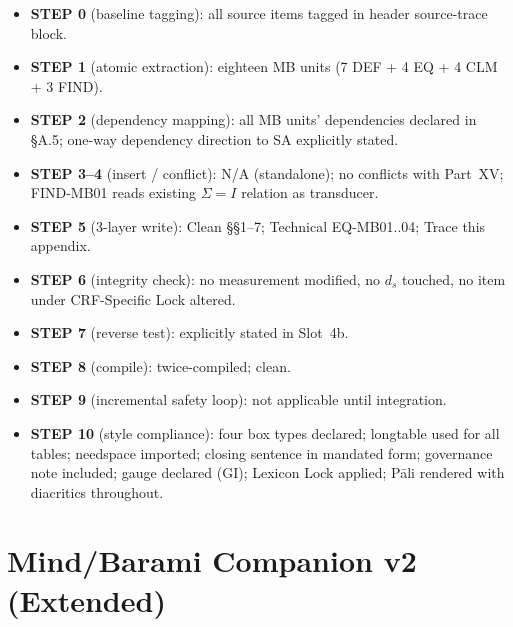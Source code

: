 \documentclass[12pt, a4paper]{article}
\providecommand{\Phiext}{\Phi_{\mathrm{ext}}}
\providecommand{\Bplus}{B_{+}}
\providecommand{\Tasava}{T_{\bar{\mathrm{a}}sava}}
\providecommand{\Tasava}{\mathcal{T}_{\!\mathrm{\bar{a}sava}}}
\begin{document}
\begin{keybox}[title={CUIP v1.1 Compliance}]
\begin{itemize}[leftmargin=*]
\item \textbf{STEP 0} (baseline tagging): all source items tagged in
header source-trace block.
\item \textbf{STEP 1} (atomic extraction): eighteen MB units (7 DEF +
4 EQ + 4 CLM + 3 FIND).
\item \textbf{STEP 2} (dependency mapping): all MB units' dependencies
declared in §A.5; one-way dependency direction to SA explicitly
stated.
\item \textbf{STEP 3--4} (insert / conflict): N/A (standalone); no
conflicts with Part~XV; FIND-MB01 reads existing $\Sigma = I$ relation
as transducer.
\item \textbf{STEP 5} (3-layer write): Clean §§1--7; Technical
EQ-MB01..04; Trace this appendix.
\item \textbf{STEP 6} (integrity check): no measurement modified, no
$d_s$ touched, no item under CRF-Specific Lock altered.
\item \textbf{STEP 7} (reverse test): explicitly stated in Slot~4b.
\item \textbf{STEP 8} (compile): twice-compiled; clean.
\item \textbf{STEP 9} (incremental safety loop): not applicable until
integration.
\item \textbf{STEP 10} (style compliance): four box types declared;
longtable used for all tables; needspace imported; closing sentence
in mandated form; governance note included; gauge declared (GI);
Lexicon Lock applied; Pāli rendered with diacritics throughout.
\end{itemize}
\end{keybox}




\newpage

\section{Mind/Barami Companion v2 (Extended)}
\label{sec:mb-v2}

\begin{abstract}
Mind $\otimes$ Barami Companion v1 formalised the Agentive Mode
of $\delta$ through seven definitions, four equations, four claims,
and three findings. It captured Barami as positive accumulation
($B_+ = Q \times (1 - H_{\rm internal})$) but had no counterpart
for what persists across cycles.

Version~2 adds that counterpart: the \={a}sava residual tree
$\Tasava$, extending $\Phi$ to $\Phiext = (\Bplus, \Tasava)$.
All v1 content is preserved verbatim; v2 is strictly additive.
\end{abstract}
\end{document}
